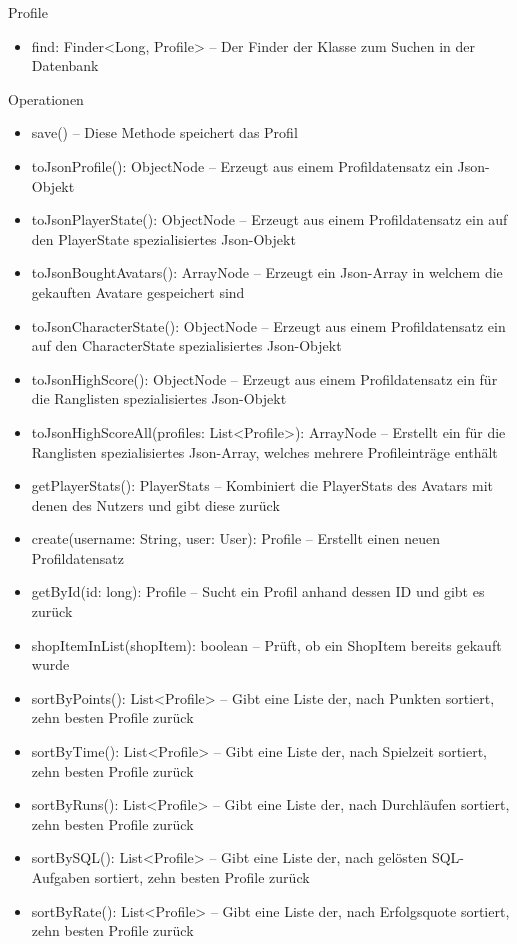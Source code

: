 \begin{class}{10}{Profile}
\begin{itemize}
\item find: Finder<Long, Profile> -- Der Finder der Klasse zum Suchen in der Datenbank
\end{itemize}
\item[Operationen]~\\
\begin{itemize}
\item save() -- Diese Methode speichert das Profil
\item toJsonProfile(): ObjectNode -- Erzeugt aus einem Profildatensatz ein Json-Objekt
\item toJsonPlayerState(): ObjectNode -- Erzeugt aus einem Profildatensatz ein auf den PlayerState spezialisiertes Json-Objekt
\item toJsonBoughtAvatars(): ArrayNode -- Erzeugt ein Json-Array in welchem die gekauften Avatare gespeichert sind
\item toJsonCharacterState(): ObjectNode --
Erzeugt aus einem Profildatensatz ein auf den CharacterState spezialisiertes Json-Objekt
\item toJsonHighScore(): ObjectNode -- Erzeugt aus einem Profildatensatz ein für die Ranglisten spezialisiertes Json-Objekt
\item toJsonHighScoreAll(profiles: List<Profile>): ArrayNode -- Erstellt ein für die Ranglisten spezialisiertes Json-Array, welches mehrere Profileinträge enthält
\item getPlayerStats(): PlayerStats -- Kombiniert die PlayerStats des Avatars mit denen des Nutzers und gibt diese zurück
\item create(username: String, user: User): Profile -- Erstellt einen neuen Profildatensatz
\item getById(id: long): Profile -- Sucht ein Profil anhand dessen ID und gibt es zurück
\item shopItemInList(shopItem): boolean -- Prüft, ob ein ShopItem bereits gekauft wurde
\item sortByPoints(): List<Profile> -- Gibt eine Liste der, nach Punkten sortiert, zehn besten Profile zurück
\item sortByTime(): List<Profile> -- Gibt eine Liste der, nach Spielzeit sortiert, zehn besten Profile zurück
\item sortByRuns(): List<Profile> -- Gibt eine Liste der, nach Durchläufen sortiert, zehn besten Profile zurück
\item sortBySQL(): List<Profile> -- Gibt eine Liste der, nach gelösten SQL-Aufgaben sortiert, zehn besten Profile zurück
\item sortByRate(): List<Profile> -- Gibt eine Liste der, nach Erfolgsquote sortiert, zehn besten Profile zurück

\end{itemize}
\end{class}
